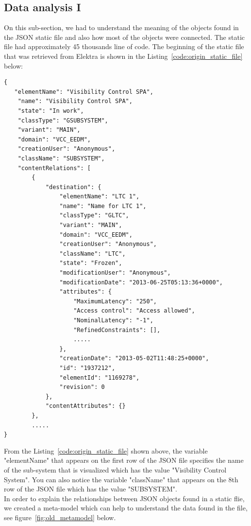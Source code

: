 \subsection{Data analysis I}
On this sub-section, we had to understand the meaning of the objects found in the JSON static file and also how most of the objects were connected. The static file had approximately 45 thousands line of code. The beginning of the static file that was retrieved from Elektra is shown in the Listing~\ref{code:origin_static_file} below:

\begin{lstlisting}[caption=A small part of how the original file appear, label=code:origin_static_file]
{
   "elementName": "Visibility Control SPA", 
    "name": "Visibility Control SPA", 
    "state": "In work", 
    "classType": "GSUBSYSTEM", 
    "variant": "MAIN", 
    "domain": "VCC_EEDM", 
    "creationUser": "Anonymous", 
    "className": "SUBSYSTEM", 
    "contentRelations": [
        {
            "destination": {
                "elementName": "LTC 1", 
                "name": "Name for LTC 1", 
                "classType": "GLTC", 
                "variant": "MAIN", 
                "domain": "VCC_EEDM", 
                "creationUser": "Anonymous", 
                "className": "LTC", 
                "state": "Frozen", 
                "modificationUser": "Anonymous", 
                "modificationDate": "2013-06-25T05:13:36+0000", 
                "attributes": {
                    "MaximumLatency": "250", 
                    "Access control": "Access allowed", 
                    "NominalLatency": "-1", 
                    "RefinedConstraints": [], 
                    .....
                }, 
                "creationDate": "2013-05-02T11:48:25+0000", 
                "id": "1937212", 
                "elementId": "1169278", 
                "revision": 0
            }, 
            "contentAttributes": {}
        }, 
        .....   
}
\end{lstlisting}

From the Listing~\ref{code:origin_static_file} shown above, the variable "elementName" that appears on the first row of the JSON file specifies the name of the sub-system that is visualized which has the value "Visibility Control System". You can also notice the variable "className" that appears on the 8th row of the JSON file which has the value "SUBSYSTEM". \\

In order to explain the relationships between JSON objects found in a static flie, we created a meta-model which can help to understand the data found in the file, see figure~\ref{fig:old_metamodel} below.

